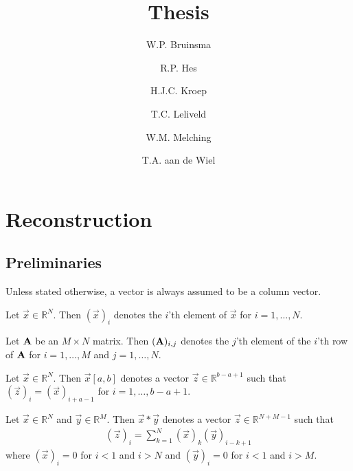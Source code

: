 \documentclass[a4paper, openany, oneside]{memoir}
\title{Thesis}
\author{W.P. Bruinsma \and R.P. Hes \and H.J.C. Kroep \and T.C. Leliveld \and W.M. Melching \and T.A. aan de Wiel}
\begin{document}
\frontmatter

\begin{titlingpage}
  \pagestyle{empty}
  \maketitle
\end{titlingpage}

\tableofcontents

\mainmatter

\chapter{Reconstruction}

\section{Preliminaries}
Unless stated otherwise, a vector is always assumed to be a column vector.

\begin{blockDefinition}
    Let $\vec{x} \in \mathbb{R}^N$. Then $(\vec{x})_i$ denotes the $i$'th element of $\vec{x}$ for $i = 1,\ldots,N$.
\end{blockDefinition}

\begin{blockDefinition}
    Let $\boldsymbol{\mathbf{A}}$ be an $M \times N$ matrix. Then $(\boldsymbol{\mathbf{A}})_{i,j}$ denotes the $j$'th element of the $i$'th row of $\boldsymbol{\mathbf{A}}$ for $i = 1,\ldots,M$ and $j=1,\ldots,N$.
\end{blockDefinition}

\begin{blockDefinition}[Subvector]
    Let $\vec{x} \in \mathbb{R}^N$. Then $\vec{x}[a,b]$ denotes a vector $\vec{z} \in \mathbb{R}^{b-a+1}$ such that $(\vec{z})_i = (\vec{x})_{i+a-1}$ for $i = 1,\ldots,b-a+1$.
\end{blockDefinition}

\begin{blockDefinition}[Convolution]
    Let $\vec{x} \in \mathbb{R}^N$ and $\vec{y} \in \mathbb{R}^M$. Then $\vec{x} \ast \vec{y}$ denotes a vector $\vec{z} \in \mathbb{R}^{N+M-1}$ such that
    \begin{align*}
        (\vec{z})_i = \sum_{k=1}^{N} (\vec{x})_k (\vec{y})_{i-k+1}
    \end{align*}
    where $(\vec{x})_i=0$ for $i < 1$ and $i > N$ and $(\vec{y})_i=0$ for $i < 1$ and $i > M$.
\end{blockDefinition}
\end{document}

